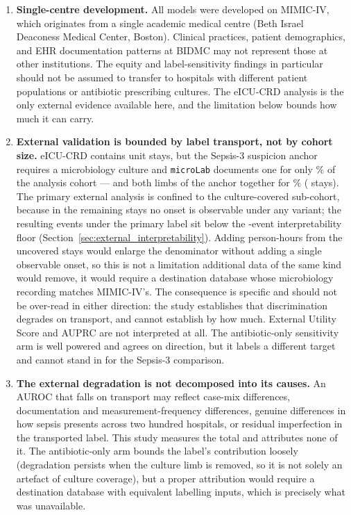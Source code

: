\begin{enumerate}
    \item \textbf{Single-centre development.} All models were developed on
    MIMIC-IV, which originates from a single academic medical centre (Beth
    Israel Deaconess Medical Center, Boston). Clinical practices, patient
    demographics, and EHR documentation patterns at BIDMC may not represent
    those at other institutions. The equity and label-sensitivity findings in
    particular should not be assumed to transfer to hospitals with different
    patient populations or antibiotic prescribing cultures. The eICU-CRD
    analysis is the only external evidence available here, and the limitation
    below bounds how much it can carry.

    \item \textbf{External validation is bounded by label transport, not by
    cohort size.} eICU-CRD contains \pcExtNCohortStays{} unit stays, but the
    Sepsis-3 suspicion anchor requires a microbiology culture and
    \texttt{microLab} documents one for only \pcExtMicroCoverage\% of the
    analysis cohort --- and both limbs of the anchor together for
    \pcExtBothLimbCoverage\% (\pcExtNBothLimbStays{} stays). The primary
    external analysis is confined to the culture-covered
    sub-cohort, because in the remaining stays no onset is observable under any
    variant; the resulting \pcExtNEventsB{} events under the primary label sit
    below the \pcExtMinEvents{}-event interpretability floor
    (Section~\ref{sec:external_interpretability}). Adding person-hours from the
    uncovered stays would enlarge the denominator without adding a single
    observable onset, so this is not a limitation additional data of the same
    kind would remove, it would require a destination database whose
    microbiology recording matches MIMIC-IV's. The consequence is specific and
    should not be over-read in either direction: the study establishes that
    discrimination degrades on transport, and cannot establish by how much.
    External Utility Score and AUPRC are not interpreted at all. The
    antibiotic-only sensitivity arm is well powered and agrees on direction,
    but it labels a different target and cannot stand in for the Sepsis-3
    comparison.

    \item \textbf{The external degradation is not decomposed into its causes.}
    An AUROC that falls on transport may reflect case-mix differences,
    documentation and measurement-frequency differences, genuine differences in
    how sepsis presents across two hundred hospitals, or residual imperfection
    in the transported label. This study measures the total and attributes none
    of it. The antibiotic-only arm bounds the label's contribution loosely (degradation persists when the culture limb is removed, so it is not solely
    an artefact of culture coverage), but a proper attribution would require
    a destination database with equivalent labelling inputs, which is precisely
    what was unavailable.


\end{enumerate}
